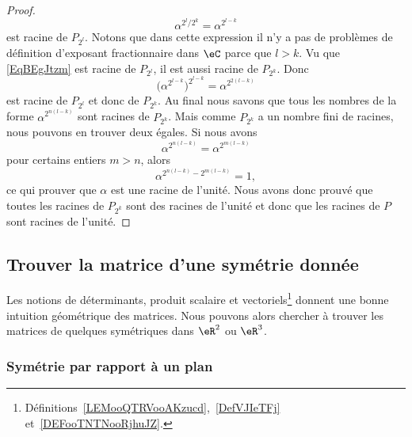 \begin{proof}
    \begin{equation}    \label{EqBEgJtzm}
        \alpha^{2^l/2^k}=\alpha^{2^{l-k}}
    \end{equation}
    est racine de \( P_{2^l}\). Notons que dans cette expression il n'y a pas de problèmes de définition d'exposant fractionnaire dans \( \eC\) parce que \( l>k\). Vu que \eqref{EqBEgJtzm} est racine de \( P_{2^l}\), il est aussi racine de \( P_{2^k}\). Donc
    \begin{equation}
        \big( \alpha^{2^{l-k}} \big)^{2^{l-k}}=\alpha^{2^{2(l-k)}}
    \end{equation}
    est racine de \( P_{2^l}\) et donc de \( P_{2^k}\). Au final nous savons que tous les nombres de la forme \( \alpha^{2^{n(l-k)}}\) sont racines de \( P_{2^k}\). Mais comme \( P_{2^k}\) a un nombre fini de racines, nous pouvons en trouver deux égales. Si nous avons
    \begin{equation}
        \alpha^{2^{n(l-k)}}=\alpha^{2^{m(l-k)}}
    \end{equation}
    pour certains entiers \( m>n\), alors
    \begin{equation}
        \alpha^{2^{n(l-k)}-2^{m(l-k)}}=1,
    \end{equation}
    ce qui prouver que \( \alpha\) est une racine de l'unité. Nous avons donc prouvé que toutes les racines de \( P_{2^k}\) sont des racines de l'unité et donc que les racines de \( P\) sont racines de l'unité.
\end{proof}

\subsection{Trouver la matrice d'une symétrie donnée}
\label{SubSecMtrSym}

Les notions de déterminants, produit scalaire et vectoriels\footnote{Définitions~\ref{LEMooQTRVooAKzucd},~\ref{DefVJIeTFj} et~\ref{DEFooTNTNooRjhuJZ}.} donnent une bonne intuition géométrique des matrices. Nous pouvons alors chercher à trouver les matrices de quelques symétriques dans \( \eR^2\) ou \( \eR^3\).

\subsubsection{Symétrie par rapport à un plan}


